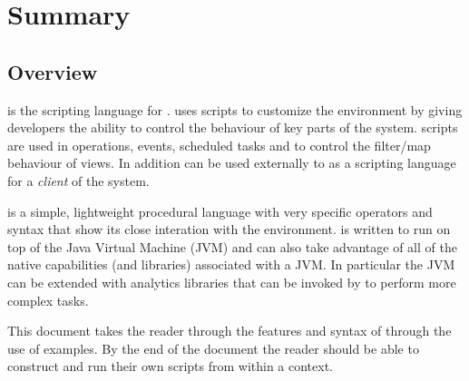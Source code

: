\part{Summary}

\chapter{Overview}
\Reflex is the scripting language for \Rapture. \Rapture uses \Reflex scripts to customize the environment by giving developers the ability to control the behaviour of key parts of the system. \Reflex scripts are used in \Rapture operations, events, scheduled tasks and to control the filter/map behaviour of views. In addition \Reflex can be used externally to \Rapture as a scripting language for a \emph{client} of the system.

\Reflex is a simple, lightweight procedural language with very specific operators and syntax that show its close interation with the \Rapture environment. \Reflex is written to run on top of the Java Virtual Machine (JVM) and can also take advantage of all of the native capabilities (and libraries) associated with a JVM. In particular the \Rapture JVM can be extended with analytics libraries that can be invoked by \Reflex to perform more complex tasks.

This document takes the reader through the features and syntax of \Reflex through the use of examples. By the end of the document the reader should be able to construct and run their own scripts from within a \Rapture context.


